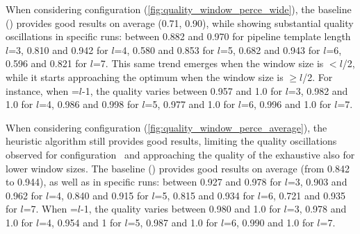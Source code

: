    When considering configuration \wide (\cref{fig:quality_window_perce_wide}), the baseline () provides good results on average (0.71, 0.90), while showing substantial quality oscillations in specific runs: between 0.882 and 0.970 for pipeline template length $l$=3, 0.810 and 0.942 for $l$=4, 0.580 and 0.853 for $l$=5, 0.682 and 0.943 for $l$=6, 0.596 and 0.821 for $l$=7. This same trend emerges when the window size is $<$$l$/2, while it starts approaching the optimum when the window size is $\geq$$l$/2. For instance, when \windowsize=$l$-1, the quality varies between 0.957 and 1.0 for $l$=3, 0.982 and 1.0 for $l$=4, 0.986 and 0.998 for $l$=5, 0.977 and 1.0 for $l$=6, 0.996 and 1.0 for $l$=7.

    When considering configuration \average (\cref{fig:quality_window_perce_average}), the heuristic algorithm still provides good results, limiting the quality oscillations observed for configuration \wide\ and approaching the quality of the exhaustive also for lower window sizes. The baseline () provides good results on average (from 0.842 to 0.944), as well as in specific runs: between 0.927 and 0.978 for $l$=3, 0.903 and 0.962 for $l$=4, 0.840 and 0.915 for $l$=5, 0.815 and 0.934 for $l$=6, 0.721 and 0.935 for $l$=7.
    When \windowsize=$l$-1, the quality varies between 0.980 and 1.0 for $l$=3, 0.978 and 1.0 for $l$=4, 0.954 and 1 for $l$=5, 0.987 and 1.0 for $l$=6, 0.990 and 1.0 for $l$=7.

